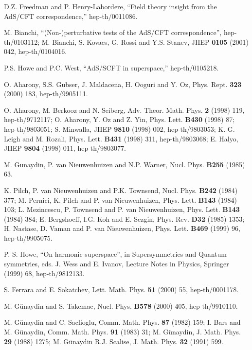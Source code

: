 \documentclass[a4paper,11pt]{article}
\begin{document}
\begin{thebibliography}{99}

{\small
{}
D.Z. Freedman and P. Henry-Labordere, ``Field theory insight from
the AdS/CFT correspondence,'' hep-th/0011086.

M. Bianchi, ``(Non-)perturbative tests of the AdS/CFT
correspondence'', hep-th/0103112; M. Bianchi, S. Kovacs, G. Rossi
and Y.S. Stanev, JHEP {\bf 0105} (2001) 042, hep-th/0104016.

P.S. Howe and P.C. West, ``AdS/SCFT in superspace,''
hep-th/0105218.

O. Aharony, S.S. Gubser, J. Maldacena, H. Ooguri and Y. Oz, Phys.
Rept. {\bf 323} (2000) 183,  hep-th/9905111.

O. Aharony, M. Berkooz and N. Seiberg, Adv. Theor. Math. Phys.
{\bf 2} (1998) 119, hep-th/9712117; O. Aharony, Y. Oz and Z. Yin,
Phys. Lett. {\bf B430} (1998) 87; hep-th/9803051; S. Minwalla,
JHEP {\bf 9810} (1998) 002, hep-th/9803053; K. G. Leigh and M.
Rozali, Phys. Lett. {\bf B431} (1998) 311, hep-th/9803068; E.
Halyo, JHEP {\bf 9804} (1998) 011, hep-th/9803077.

M. Gunaydin, P. van Nieuwenhuizen and N.P. Warner, Nucl. Phys.
{\bf B255} (1985) 63.

K. Pilch, P. van Nieuwenhuizen and P.K. Townsend, Nucl. Phys. {\bf
B242} (1984) 377; M. Pernici, K. Pilch and P. van Nieuwenhuizen,
Phys. Lett. {\bf B143} (1984) 103; L. Mezincescu, P. Townsend and
P. van Nieuwenhuizen, Phys. Lett. {\bf B143} (1984) 384; E.
Bergshoeff, I.G. Koh and E. Sezgin, Phys. Rev. {\bf D32} (1985)
1353; H. Nastase, D. Vaman and P. van Nieuwenhuizen, Phys. Lett.
{\bf B469} (1999) 96, hep-th/9905075.

P. S. Howe, ``On harmonic superspace'', in Supersymmetries and
Quantum symmetries, eds. J. Wess and E. Ivanov, Lecture Notes in
Physics, Springer (1999) 68, hep-th/9812133.

S. Ferrara and E. Sokatchev, Lett. Math. Phys. {\bf 51} (2000) 55,
hep-th/0001178.

M. G\"unaydin and S. Takemae, Nucl. Phys.  {\bf B578} (2000) 405,
hep-th/9910110.

M. G{\"u}naydin and C. Saclioglu, Comm. Math. Phys. {\bf 87}
(1982) 159; I. Bars and M. G{\"u}naydin, Comm. Math. Phys. {\bf
91} (1983) 31; M. G{\"unaydin}, J. Math. Phys. {\bf 29} (1988)
1275; M. G{\"u}naydin R.J. Scalise, J. Math. Phys. {\bf 32} (1991)
599.

}
\end{thebibliography}
\end{document}
